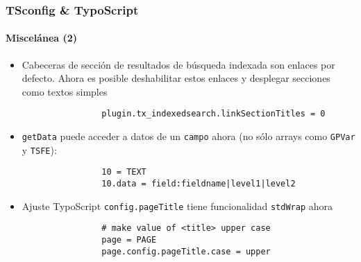 \begin{frame}[fragile]
	\frametitle{TSconfig \& TypoScript}
	\framesubtitle{Miscelánea (2)}

	\begin{itemize}

		\item Cabeceras de sección de resultados de búsqueda indexada son enlaces por defecto.
			Ahora es posible deshabilitar estos enlaces y desplegar secciones como textos simples

			\begin{lstlisting}
				plugin.tx_indexedsearch.linkSectionTitles = 0
			\end{lstlisting}

		\item \texttt{getData} puede acceder a datos de un \texttt{campo} ahora (no sólo arrays
			como \texttt{GPVar} y \texttt{TSFE}):
		
			\begin{lstlisting}
				10 = TEXT
				10.data = field:fieldname|level1|level2
			\end{lstlisting}

		\item Ajuste TypoScript \texttt{config.pageTitle} tiene funcionalidad \texttt{stdWrap} ahora

			\begin{lstlisting}
				# make value of <title> upper case
				page = PAGE
				page.config.pageTitle.case = upper
			\end{lstlisting}

	\end{itemize}

\end{frame}

